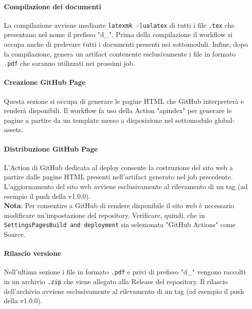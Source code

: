 

\paragraph{Compilazione dei documenti} La compilazione avviene mediante \texttt{latexmk -lualatex} di tutti i file \texttt{.tex} che presentano nel nome il prefisso "d\_". Prima della compilazione il workflow si occupa anche di prelevare tutti i documenti presenti nei sottomoduli. Infine, dopo la compilazione, genera un artifact contenente esclusivamente i file in formato \texttt{.pdf} che saranno utilizzati nei prossimi job.



\paragraph{Creazione GitHub Page} Questa sezione si occupa di generare le pagine HTML che GitHub interpreterà e renderà disponibili. Il workflow fa uso della Action "apindex" per generare le pagine a partire da un template messo a disposizione nel sottomodulo global-assets.



\paragraph{Distribuzione GitHub Page} L'Action di GitHub dedicata al deploy consente la costruzione del sito web a partire dalle pagine HTML presenti nell'artifact generato nel job precedente. L'aggiornamento del sito web avviene esclusivamente al rilevamento di un tag (ad esempio il push della v1.0.0).\\
\textbf{Nota}: Per consentire a GitHub di rendere disponibile il sito web è necessario modificare un'impostazione del repository. Verificare, quindi, che in \texttt{Settings\rightarrow Pages\rightarrow Build and deployment} sia selezionata "GitHub Actions" come Source.



\paragraph{Rilascio versione} Nell'ultima sezione i file in formato \texttt{.pdf} e privi di prefisso "d\_" vengono raccolti in un archivio \texttt{.zip} che viene allegato alla Release del repository. Il rilascio dell'archivio avviene esclusivamente al rilevamento di un tag (ad esempio il push della v1.0.0).

